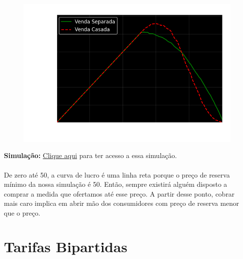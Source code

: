 \documentclass[a4paper,11pt,oneside]{book}
\theoremstyle{definition}
\theoremstyle{break}
\begin{document}
\begin{figure}[H]
\centering
\includegraphics[scale=0.8]{cap26_5-venda_casada.png}
\end{figure}

\textbf{Simulação:} \href{https://drive.google.com/file/d/1WhxGaAhUB9dKkgrKWadihIrzS4cm3bXP/view?usp=sharing}{Clique aqui} para ter acesso a essa simulação.
\\
\\
De zero até 50, a curva de lucro é uma linha reta porque o preço de reserva mínimo da nossa simulação é 50. Então, sempre existirá alguém disposto a comprar a medida que ofertamos até esse preço. A partir desse ponto, cobrar mais caro implica em abrir mão dos consumidores com preço de reserva menor que o preço.

\section{Tarifas Bipartidas}
\end{document}
